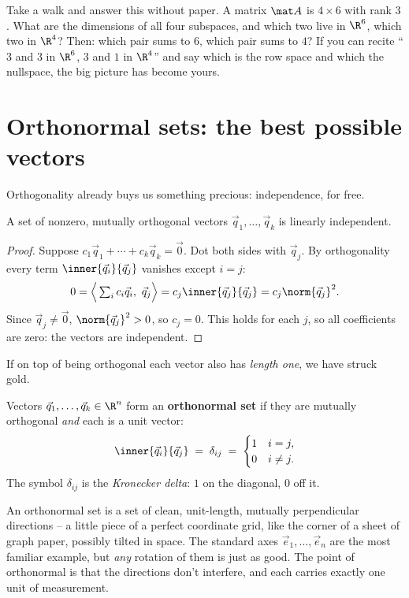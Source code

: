 \begin{walkbox}
Take a walk and answer this without paper. A matrix $\mat A$ is $4\times 6$ with rank $3$. What are
the dimensions of all four subspaces, and which two live in $\R^6$, which two in $\R^4$? Then:
which pair sums to $6$, which pair sums to $4$? If you can recite ``$3$ and $3$ in $\R^6$, $3$ and
$1$ in $\R^4$'' and say which is the row space and which the nullspace, the big picture has become
yours.
\end{walkbox}

\section{Orthonormal sets: the best possible vectors}

Orthogonality already buys us something precious: independence, for free.

\begin{proposition}\label{ch17:orthog-implies-indep}
A set of nonzero, mutually orthogonal vectors $\vec{q}_1,\dots,\vec{q}_k$ is linearly independent.
\end{proposition}

\begin{proof}
Suppose $c_1\vec q_1+\cdots+c_k\vec q_k=\vec 0$. Dot both sides with $\vec q_j$. By orthogonality
every term $\inner{\vec q_i}{\vec q_j}$ vanishes except $i=j$:
\[
  0 = \Big\langle \textstyle\sum_i c_i\vec q_i,\ \vec q_j\Big\rangle
    = c_j\inner{\vec q_j}{\vec q_j} = c_j\norm{\vec q_j}^2.
\]
Since $\vec q_j\neq\vec 0$, $\norm{\vec q_j}^2>0$, so $c_j=0$. This holds for each $j$, so all
coefficients are zero: the vectors are independent.
\end{proof}

If on top of being orthogonal each vector also has \emph{length one}, we have struck gold.

\begin{definition}\label{ch17:def-orthonormal}
Vectors $\vec q_1,\dots,\vec q_k\in\R^n$ form an \textbf{orthonormal set} if they are mutually
orthogonal \emph{and} each is a unit vector:
\[
  \inner{\vec q_i}{\vec q_j} \;=\; \delta_{ij} \;=\;
  \begin{cases} 1 & i=j,\\ 0 & i\neq j.\end{cases}
\]
The symbol $\delta_{ij}$ is the \emph{Kronecker delta}: $1$ on the diagonal, $0$ off it.
\end{definition}

\begin{intuitionbox}
An orthonormal set is a set of clean, unit-length, mutually perpendicular directions -- a little
piece of a perfect coordinate grid, like the corner of a sheet of graph paper, possibly tilted in
space. The standard axes $\vec e_1,\dots,\vec e_n$ are the most familiar example, but \emph{any}
rotation of them is just as good. The point of orthonormal is that the directions don't interfere,
and each carries exactly one unit of measurement.
\end{intuitionbox}


